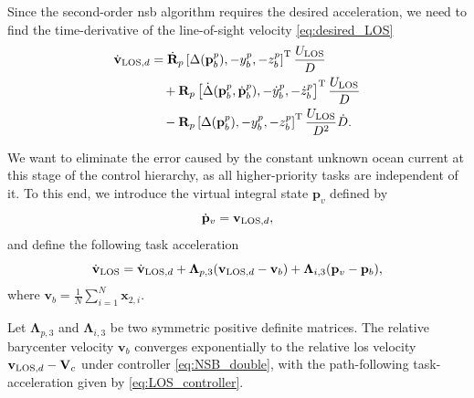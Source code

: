 Since the second-order \gls{nsb} algorithm requires the desired acceleration, we need to find the time-derivative of the line-of-sight velocity \eqref{eq:desired_LOS}
\begin{equation}\label{eq:desired_LOS_derivative}
\begin{split}
        \dot{\mathbf{v}}_{{\rm LOS}, d} &= \dot{\mathbf{R}}_p\left[ \Delta(\mathbf{p}_b^p), -y_b^p, -z_b^p \right]^{\mathrm{T}} \frac{U_{\rm LOS}}{D} \\ & \quad + \mathbf{R}_p \left[ \dot{\Delta}(\mathbf{p}_b^p, \dot{\mathbf{p}}_b^p), -\dot{y}_b^p, -\dot{z}_b^p \right]^{\mathrm{T}} \frac{U_{\rm LOS}}{D}\\ & \quad - \mathbf{R}_p \left[ \Delta(\mathbf{p}_b^p), -y_b^p, -z_b^p \right]^{\mathrm{T}} \frac{U_{\rm LOS}}{D^2}\dot{D}.
    \end{split}
\end{equation}

We want to eliminate the error caused by the constant unknown ocean current at this stage of the control hierarchy, as all higher-priority tasks are independent of it. To this end, we introduce the virtual integral state $\mathbf{p}_v$ defined by
\begin{equation}\label{eq:los_integral_state}
    \dot{\mathbf{p}}_v = \mathbf{v}_{{\rm LOS}, d},
\end{equation}
and define the following task acceleration
\begin{equation} \label{eq:LOS_controller}
    \dot{\mathbf{v}}_{\rm LOS} = \dot{\mathbf{v}}_{{\rm LOS}, d} + \mathbf{\Lambda}_{p,3} (\mathbf{v}_{{\rm LOS}, d} - \mathbf{v}_b) + \mathbf{\Lambda}_{i,3} (\mathbf{p}_v-\mathbf{p}_b),
\end{equation}
where $\mathbf{v}_b = \tfrac{1}{N} \sum_{i=1}^N \mathbf{x}_{2,i}$.

\begin{lemma}\label{lemma:LOS_controller}
    Let $\bm{\Lambda}_{p,3}$ and $\bm{\Lambda}_{i,3}$ be two symmetric positive definite matrices. The relative barycenter velocity $\mathbf{v}_b$ converges exponentially to the relative \gls{los} velocity $\mathbf{v}_{{\rm LOS}, d}-\mathbf{V}_c$ under controller \eqref{eq:NSB_double}, with the path-following task-acceleration given by \eqref{eq:LOS_controller}.
\end{lemma}

